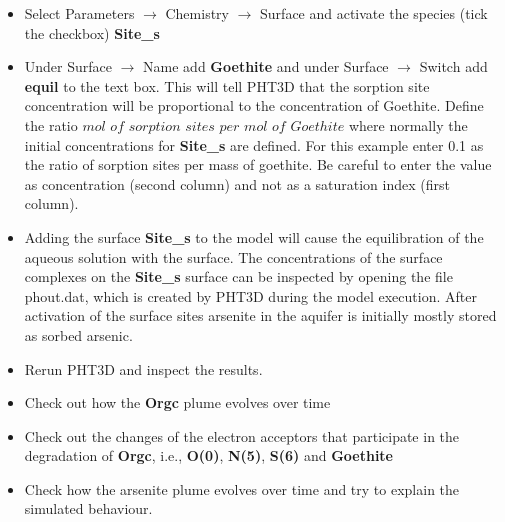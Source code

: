 \begin{itemize}

\item Select Parameters $\rightarrow$ Chemistry $\rightarrow$ Surface and 
activate the species (tick the checkbox) {\color{red} \textbf{Site\_s}} 

\item Under Surface $\rightarrow$ Name add {\color{red} \textbf{Goethite}} and under Surface $\rightarrow$ Switch  add {\color{red} \textbf{equil}} to the text box. This will tell PHT3D that the sorption site concentration will be proportional to the concentration of Goethite. Define the ratio $mol$ $of$ $sorption$ $sites$ 
$per$ $mol$ $of$ $Goethite$ where normally the initial concentrations for {\color{red} \textbf{Site\_s}} are defined.
For this example enter 0.1 as the ratio of sorption sites per mass of goethite. 
Be careful to enter the value as concentration (second column) and not as a saturation index (first column).

\item Adding the surface {\color{red} \textbf{Site\_s}} to the model will cause the equilibration of the aqueous solution with the surface. The concentrations of the surface complexes on the {\color{red} \textbf{Site\_s}} surface can be inspected by opening the file phout.dat, which is created by PHT3D during the model execution. After activation of the surface sites arsenite in the aquifer is initially mostly stored as sorbed arsenic.  

\item Rerun PHT3D and inspect the results. 

\item Check out how the {\color{red} \textbf{Orgc}} plume evolves over time

\item Check out the changes of the electron acceptors that participate in the 
degradation of {\color{red} \textbf{Orgc}}, i.e., {\color{red} \textbf{O(0)}}, 
{\color{red} \textbf{N(5)}}, {\color{red} \textbf{S(6)}} and {\color{red} \textbf{Goethite}}

\item Check how the arsenite plume evolves over time and try to explain the simulated behaviour. 

\end{itemize}



 







